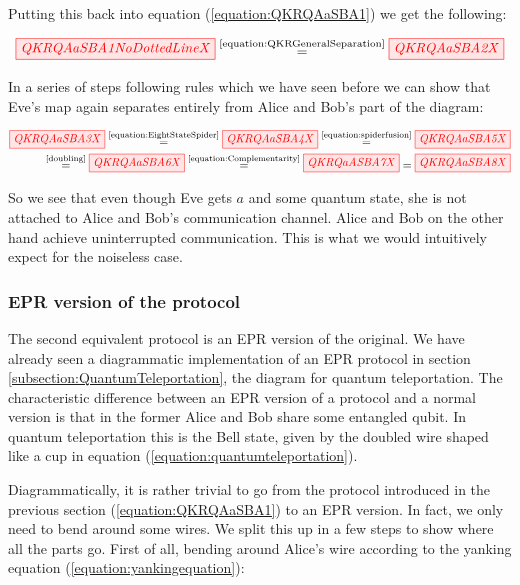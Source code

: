 \documentclass[]{article}
\newcommand{\equaltext}[1]{\ensuremath{\stackrel{\text{#1}}{=}}}
\begin{document}
Putting this back into equation (\ref{equation:QKRQAaSBA1}) we get the following:

\begin{equation}
	\tikzfig{QKRQAaSBA1NoDottedLineX} \equaltext{\ref{equation:QKRGeneralSeparation}} \tikzfig{QKRQAaSBA2X}
\end{equation}

In a series of steps following rules which we have seen before we can show that Eve's map again separates entirely from Alice and Bob's part of the diagram:

\begin{equation}
	\begin{aligned}
	\tikzfig{QKRQAaSBA3X} \equaltext{\ref{equation:EightStateSpider}} \tikzfig{QKRQAaSBA4X} \equaltext{\ref{equation:spiderfusion}} \tikzfig{QKRQAaSBA5X} \\ \equaltext{\ref{doubling}} \tikzfig{QKRQAaSBA6X} \equaltext{\ref{equation:Complementarity}} \tikzfig{QKRQaASBA7X} = \tikzfig{QKRQAaSBA8X}
	\end{aligned}
\end{equation}

So we see that even though Eve gets $a$ and some quantum state, she is not attached to Alice and Bob's communication channel. Alice and Bob on the other hand achieve uninterrupted communication. This is what we would intuitively expect for the noiseless case.

\subsubsection{EPR version of the protocol}

\label{section:eprqkr}
The second equivalent protocol is an EPR version of the original. We have already seen a diagrammatic implementation of an EPR protocol in section \ref{subsection:QuantumTeleportation}, the diagram for quantum teleportation. The characteristic difference between an EPR version of a protocol and a normal version is that in the former Alice and Bob share some entangled qubit. In quantum teleportation this is the Bell state, given by the doubled wire shaped like a cup in equation (\ref{equation:quantumteleportation}).

Diagrammatically, it is rather trivial to go from the protocol introduced in the previous section (\ref{equation:QKRQAaSBA1}) to an EPR version. In fact, we only need to bend around some wires. We split this up in a few steps to show where all the parts go. First of all, bending around Alice's wire according to the yanking equation (\ref{equation:yankingequation}):
\end{document}
